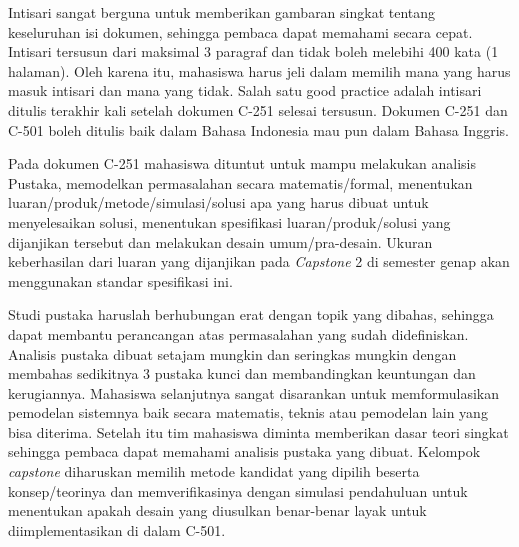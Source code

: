 
Intisari sangat berguna untuk memberikan gambaran singkat tentang keseluruhan isi dokumen, sehingga pembaca dapat memahami secara cepat. Intisari tersusun dari maksimal 3 paragraf dan tidak boleh melebihi 400 kata (1 halaman). Oleh karena itu, mahasiswa harus jeli dalam memilih mana yang harus masuk intisari dan mana yang tidak. Salah satu good practice adalah intisari ditulis terakhir kali setelah dokumen C-251 selesai tersusun. Dokumen C-251 dan C-501 boleh ditulis baik dalam Bahasa Indonesia mau pun dalam Bahasa Inggris.

Pada dokumen C-251 mahasiswa dituntut untuk mampu melakukan analisis Pustaka, memodelkan permasalahan secara matematis/formal, menentukan luaran/produk/metode/simulasi/solusi apa yang harus dibuat untuk menyelesaikan solusi, menentukan spesifikasi luaran/produk/solusi yang dijanjikan tersebut dan melakukan desain umum/pra-desain. Ukuran keberhasilan dari luaran yang dijanjikan pada \textit{Capstone} 2 di semester genap akan menggunakan standar spesifikasi ini. 

Studi pustaka haruslah berhubungan erat dengan topik yang dibahas, sehingga dapat membantu perancangan atas permasalahan yang sudah didefiniskan. Analisis pustaka dibuat setajam mungkin dan seringkas mungkin dengan membahas sedikitnya 3 pustaka kunci dan membandingkan keuntungan dan kerugiannya. Mahasiswa selanjutnya sangat disarankan untuk memformulasikan pemodelan sistemnya baik secara matematis, teknis atau pemodelan lain yang bisa diterima. Setelah itu tim mahasiswa diminta memberikan dasar teori singkat sehingga pembaca dapat memahami analisis pustaka yang dibuat. Kelompok \textit{capstone} diharuskan memilih metode kandidat yang dipilih beserta konsep/teorinya dan memverifikasinya dengan simulasi pendahuluan untuk menentukan apakah desain yang diusulkan benar-benar layak untuk diimplementasikan di dalam C-501. 
